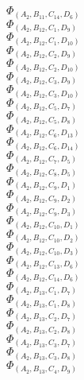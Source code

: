 \documentclass[14pt]{article}
\begin{document}
    $\Phi_{({A}_{2}, {B}_{11}, {C}_{14}, {D}_{6})}$ \\ 
    $\Phi_{({A}_{2}, {B}_{12}, {C}_{1}, {D}_{9})}$ \\ 
    $\Phi_{({A}_{2}, {B}_{12}, {C}_{1}, {D}_{10})}$ \\ 
    $\Phi_{({A}_{2}, {B}_{12}, {C}_{2}, {D}_{9})}$ \\ 
    $\Phi_{({A}_{2}, {B}_{12}, {C}_{2}, {D}_{10})}$ \\ 
    $\Phi_{({A}_{2}, {B}_{12}, {C}_{3}, {D}_{9})}$ \\ 
    $\Phi_{({A}_{2}, {B}_{12}, {C}_{3}, {D}_{10})}$ \\ 
    $\Phi_{({A}_{2}, {B}_{12}, {C}_{5}, {D}_{7})}$ \\ 
    $\Phi_{({A}_{2}, {B}_{12}, {C}_{5}, {D}_{8})}$ \\ 
    $\Phi_{({A}_{2}, {B}_{12}, {C}_{6}, {D}_{13})}$ \\ 
    $\Phi_{({A}_{2}, {B}_{12}, {C}_{6}, {D}_{14})}$ \\ 
    $\Phi_{({A}_{2}, {B}_{12}, {C}_{7}, {D}_{5})}$ \\ 
    $\Phi_{({A}_{2}, {B}_{12}, {C}_{8}, {D}_{5})}$ \\ 
    $\Phi_{({A}_{2}, {B}_{12}, {C}_{9}, {D}_{1})}$ \\ 
    $\Phi_{({A}_{2}, {B}_{12}, {C}_{9}, {D}_{2})}$ \\ 
    $\Phi_{({A}_{2}, {B}_{12}, {C}_{9}, {D}_{3})}$ \\ 
    $\Phi_{({A}_{2}, {B}_{12}, {C}_{10}, {D}_{1})}$ \\ 
    $\Phi_{({A}_{2}, {B}_{12}, {C}_{10}, {D}_{2})}$ \\ 
    $\Phi_{({A}_{2}, {B}_{12}, {C}_{10}, {D}_{3})}$ \\ 
    $\Phi_{({A}_{2}, {B}_{12}, {C}_{13}, {D}_{6})}$ \\ 
    $\Phi_{({A}_{2}, {B}_{12}, {C}_{14}, {D}_{6})}$ \\ 
    $\Phi_{({A}_{2}, {B}_{13}, {C}_{1}, {D}_{7})}$ \\ 
    $\Phi_{({A}_{2}, {B}_{13}, {C}_{1}, {D}_{8})}$ \\ 
    $\Phi_{({A}_{2}, {B}_{13}, {C}_{2}, {D}_{7})}$ \\ 
    $\Phi_{({A}_{2}, {B}_{13}, {C}_{2}, {D}_{8})}$ \\ 
    $\Phi_{({A}_{2}, {B}_{13}, {C}_{3}, {D}_{7})}$ \\ 
    $\Phi_{({A}_{2}, {B}_{13}, {C}_{3}, {D}_{8})}$ \\ 
    $\Phi_{({A}_{2}, {B}_{13}, {C}_{4}, {D}_{9})}$ \\ 
\end{document}
